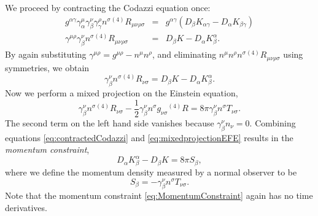 We proceed by contracting the Codazzi equation once:
\begin{equation}
\begin{array}{rcl}
g^{\alpha \gamma}\gamma_\alpha^\mu \gamma_\beta^\nu \gamma_\gamma^\rho n^\sigma {}^{(4)}R_{\mu \nu \rho \sigma} &=& g^{\alpha \gamma}(D_\beta K_{\alpha \gamma} - D_\alpha K_{\beta \gamma})\\
\gamma^{\mu \rho}\gamma^\nu_\beta n^\sigma {}^{(4)}R_{\mu \nu \rho \sigma} &=& D_\beta K - D_\alpha K_\beta^\alpha.
\end{array}
\end{equation}
By again substituting $\gamma^{\mu \rho}=g^{\mu \rho}-n^\mu n^\rho$, and eliminating $n^\mu n^\rho n^\sigma {}^{(4)}R_{\mu \nu \rho \sigma}$ using symmetries, we obtain
\begin{equation}
\label{eq:contractedCodazzi}
\gamma^\nu_\beta n^\sigma {}^{(4)}R_{\nu \sigma} = D_\beta K - D_\alpha K_\beta^\alpha.
\end{equation}
Now we perform a mixed projection on the Einstein equation,
\begin{equation}
\label{eq:mixedprojectionEFE}
\gamma^\nu_\beta n^\sigma {}^{(4)}R_{\nu \sigma}-\frac{1}{2}\gamma^\nu_\beta n^\sigma g_{\nu \sigma} {}^{(4)}R= 8\pi \gamma^\nu_\beta n^\sigma T_{\nu \sigma}. 
\end{equation}
The second term on the left hand side vanishes because $\gamma^\nu_\beta n_\nu =0$. Combining equations \ref{eq:contractedCodazzi} and \ref{eq:mixedprojectionEFE} results in the \textit{momentum constraint},
\begin{equation}
\label{eq:MomentumConstraint}
D_\alpha K_\beta^\alpha-D_\beta K = 8\pi S_{\beta},
\end{equation}
where we define the momentum density measured by a normal observer to be 
\begin{equation}
\label{eq:momentumDensity}
S_{\beta} = - \gamma^\nu_\beta n^\sigma T_{\nu \sigma}.
\end{equation}
Note that the momentum constraint \ref{eq:MomentumConstraint} again has no time derivatives. 

